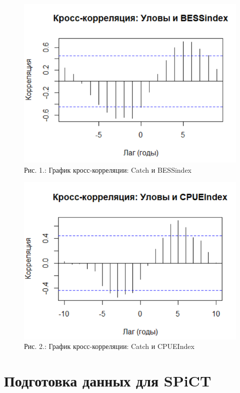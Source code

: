 \documentclass[
  letterpaper,
  DIV=11,
  numbers=noendperiod]{scrreprt}
\begin{document}
\begin{figure}[H]

{\centering \includegraphics[width=0.6\linewidth,height=\textheight,keepaspectratio]{images/SPICT1.PNG}

}

\caption{Рис. 1.: График кросс-корреляции: Catch и BESSindex}

\end{figure}%

\begin{figure}[H]

{\centering \includegraphics[width=0.6\linewidth,height=\textheight,keepaspectratio]{images/SPICT2.PNG}

}

\caption{Рис. 2.: График кросс-корреляции: Catch и CPUEIndex}

\end{figure}%

\section{Подготовка данных для
SPiCT}\label{ux43fux43eux434ux433ux43eux442ux43eux432ux43aux430-ux434ux430ux43dux43dux44bux445-ux434ux43bux44f-spict}
\end{document}
